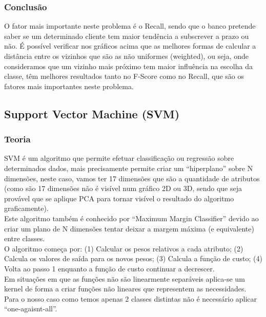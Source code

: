 \documentclass[portugues,final]{revdetua}
\begin{document}
\subsubsection{Conclusão}

O fator mais importante neste problema é o Recall, sendo que o banco pretende saber se um determinado cliente tem maior tendência a subscrever a prazo ou não. É possível verificar nos gráficos acima que as melhores formas de calcular a distância entre os vizinhos que são as não uniformes (weighted), ou seja, onde consideramos que um vizinho mais próximo tem maior influência na escolha da classe, têm melhores resultados tanto no F-Score como no Recall, que são os fatores mais importantes neste problema.\\

\subsection{Support Vector Machine (SVM)}

\subsubsection{Teoria}
SVM é um algoritmo que permite efetuar classificação ou regressão sobre determinados dados, mais precisamente permite criar um “hiperplano” sobre N dimensões, neste caso, vamos ter 17 dimensões que são a quantidade de atributos (como são 17 dimensões não é visível num gráfico 2D ou 3D, sendo que seja provável que se aplique PCA para tornar visível o resultado do algoritmo graficamente).\\

Este algoritmo também é conhecido por “Maximum Margin Classifier” devido ao criar um plano de N dimensões tentar deixar a margem máxima (e equivalente) entre classes.\\

O algoritmo começa por: (1) Calcular os pesos relativos a cada atributo; (2) Calcula os valores de saída para os novos pesos; (3) Calcula a função de custo; (4) Volta ao passo 1 enquanto a função de custo continuar a decrescer.\\

Em situações em que as funções não são linearmente separáveis aplica-se um kernel de forma a criar funções não lineares que representem as necessidades.\\

Para o nosso caso como temos apenas 2 classes distintas não é necessário aplicar “one-agaisnt-all”.\\
\end{document}
